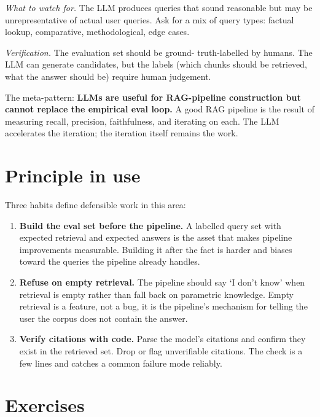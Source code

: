\documentclass[
  letterpaper,
  11pt]{scrbook}
\begin{document}
\emph{What to watch for.} The LLM produces queries that sound reasonable
but may be unrepresentative of actual user queries. Ask for a mix of
query types: factual lookup, comparative, methodological, edge cases.

\emph{Verification.} The evaluation set should be ground- truth-labelled
by humans. The LLM can generate candidates, but the labels (which chunks
should be retrieved, what the answer should be) require human judgement.

The meta-pattern: \textbf{LLMs are useful for RAG-pipeline construction
but cannot replace the empirical eval loop.} A good RAG pipeline is the
result of measuring recall, precision, faithfulness, and iterating on
each. The LLM accelerates the iteration; the iteration itself remains
the work.

\section{Principle in use}\label{principle-in-use-4}

Three habits define defensible work in this area:

\begin{enumerate}
\def\labelenumi{\arabic{enumi}.}
\item
  \textbf{Build the eval set before the pipeline.} A labelled query set
  with expected retrieval and expected answers is the asset that makes
  pipeline improvements measurable. Building it after the fact is harder
  and biases toward the queries the pipeline already handles.
\item
  \textbf{Refuse on empty retrieval.} The pipeline should say `I don't
  know' when retrieval is empty rather than fall back on parametric
  knowledge. Empty retrieval is a feature, not a bug, it is the
  pipeline's mechanism for telling the user the corpus does not contain
  the answer.
\item
  \textbf{Verify citations with code.} Parse the model's citations and
  confirm they exist in the retrieved set. Drop or flag unverifiable
  citations. The check is a few lines and catches a common failure mode
  reliably.
\end{enumerate}

\section{Exercises}\label{exercises-4}
\end{document}
